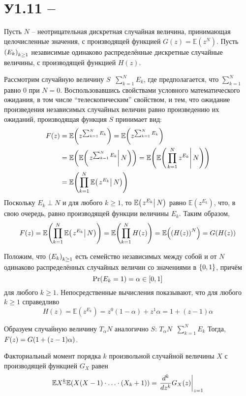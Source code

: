 \documentclass[a4paper]{article}
\let\originalleft\left
\let\originalright\right
\renewcommand{\left}{\mathopen{}\mathclose\bgroup\originalleft}
\renewcommand{\right}{\aftergroup\egroup\originalright}
\newcommand{\obj}[1]{{\left\{ #1 \right \}}}
\newcommand{\clo}[1]{{\left [ #1 \right ]}}
\newcommand{\brac}[1]{{\left ( #1 \right )}}
\newcommand{\induc}[1]{{\left . #1 \right \vert}}
\newcommand{\Ex}[0]{{\mathbb{E}}}
\newcommand{\defn}{{\mathop{\overset{\Delta}{=}}\nolimits}}
\begin{document}


\section{У1.11 -- } %
\label{sec:task_1_11}

Пусть $N$ -- неотрицательная дискретная случайная величина, принимающая
целочисленные значения, с производящей функцией $G(z) = \Ex(z^N)$.
Пусть $\brac{E_k}_{k\geq 1}$ независимые одинаково распределённые дискретные
случайные величины, с производящей функцией $H(z)$.

Рассмотрим случайную величину $S \defn \sum_{k=1}^N E_k$, где предполагается,
что $\sum_{k=1}^N$ равно $0$ при $N=0$. Воспользовавшись свойствами условного
математического ожидания, в том числе ``телескопическим'' свойством, и тем,
что ожидание произведения независимых случайных величин равно произведению
их ожиданий, производящая функция $S$ принимает вид:
\begin{align*}
	F(z) &= \Ex\brac{ z^{\sum_{k=1}^N E_k} }
	= \Ex\brac{ z^{\sum_{k=1}^N E_k} } \\
	& = \Ex\brac{ \Ex\brac{\induc{z^{\sum_{k=1}^N E_k} }\,N} }
	= \Ex\brac{ \Ex\brac{\induc{\prod_{k=1}^N z^{E_k} }\,N} } \\
	& = \Ex\brac{ \prod_{k=1}^N \Ex\brac{\induc{z^{E_k} }\,N} }
\end{align*}
Поскольку $E_k\perp N$ и для любого $k\geq 1$, то $\Ex\brac{\induc{z^{E_k} }\,N}$
равно $\Ex(z^{E_k})$, что, в свою очередь, равно производящей функции величины $E_k$.
Таким образом,
\[F(z) = \Ex\brac{ \prod_{k=1}^N \Ex\brac{\induc{z^{E_k} }\,N} }
= \Ex\brac{ \prod_{k=1}^N H(z) } = \Ex\brac{ \brac{H(z)}^N } = G\brac{H(z)}\]

Положим, что $\brac{E_k}_{k\geq 1}$ есть семейство независимых между собой и
от $N$ одинаково распределённых случайных величин со значениями в $\obj{0,1}$,
причём \[\Pr(E_k = 1) = \alpha \in \clo{0,1}\] для любого $k\geq 1$.
Непосредственные вычисления показывают, что для любого $k\geq1$ справедливо
\[H(z) = \Ex(z^{E_k}) = z^0 (1-\alpha) + z^1 \alpha = 1 + (z-1) \alpha\]

Образуем случайную величину $T_\alpha N$ аналогично $S$: $T_\alpha N \defn \sum_{k=1}^N E_k$
Тогда, $F(z) = G\brac{1 + (z-1) \alpha}$.

Факториальный момент порядка $k$ произвольной случайной величины $X$ с
производящей функцией $G_X$ равен
\[ \Ex X^{\underline{k}} \Ex\brac{X(X-1)\cdot\ldots\cdot(X_k+1)} = \induc{\frac{d^k}{dz^k} G_X(z) }_{z=1}\]
\end{document}
